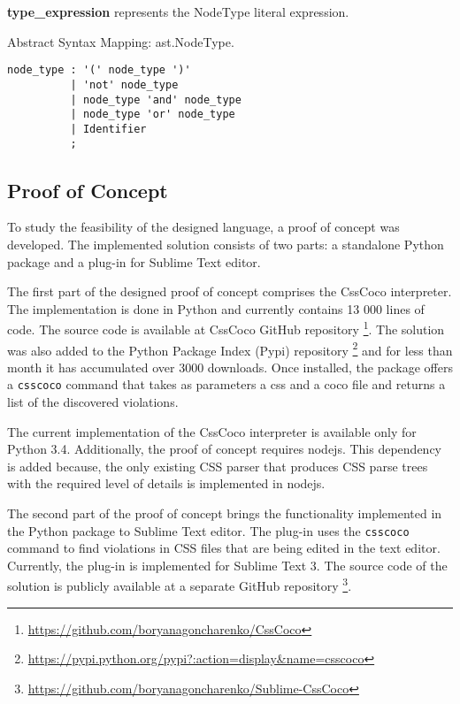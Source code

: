\begin{description}
\item\textbf{type\_expression} represents the NodeType literal expression.

Abstract Syntax Mapping: ast.NodeType.

\begin{snippet}
\begin{verbatim}
node_type : '(' node_type ')'
          | 'not' node_type
          | node_type 'and' node_type
          | node_type 'or' node_type
          | Identifier
          ;
\end{verbatim}
\end{snippet}

\end{description}

\subsection{Proof of Concept}

To study the feasibility of the designed language, a proof of concept was
developed. The implemented solution consists of two parts: a standalone
Python package and a plug-in for Sublime Text editor.

The first part of the designed proof of concept comprises the CssCoco
interpreter. The implementation is done in Python and currently contains 13
000 lines of code. The source code is available at CssCoco GitHub repository
\footnote{\url{https://github.com/boryanagoncharenko/CssCoco}}. The solution was also
added to the Python Package Index (Pypi) repository
\footnote{\url{https://pypi.python.org/pypi?:action=display&name=csscoco}}
and for less than month it has accumulated over 3000 downloads. Once
installed, the package offers a \texttt{csscoco} command that takes as
parameters a css and a coco file and returns a list of the discovered
violations.

The current implementation of the CssCoco interpreter is available only for
Python 3.4. Additionally, the proof of concept requires nodejs. This
dependency is added because, the only existing CSS parser that produces CSS
parse trees with the required level of details is implemented in nodejs.

The second part of the proof of concept brings the functionality implemented
in the Python package to Sublime Text editor. The plug-in uses the
\texttt{csscoco} command to find violations in CSS files that are being edited
in the text editor. Currently, the plug-in is implemented for Sublime Text 3.
The source code of the solution is publicly available at a separate GitHub repository
\footnote{\url{https://github.com/boryanagoncharenko/Sublime-CssCoco}}.

